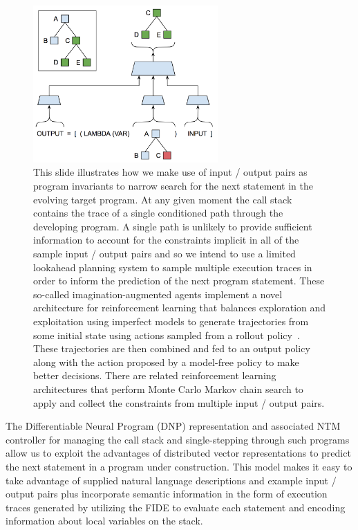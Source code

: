 \begin{figure}
%
  \begin{center} 
    \includegraphics[width=200pt]{./figures/Differentiable_Program_Emulation.png} %
  \end{center}
%
  \caption{This slide illustrates how we make use of input / output pairs as program invariants to narrow search for the next statement in the evolving target program. At any given moment the call stack contains the trace of a single conditioned path through the developing program. A single path is unlikely to provide sufficient information to account for the constraints implicit in all of the sample input / output pairs and so we intend to use a limited lookahead planning system to sample multiple execution traces in order to inform the prediction of the next program statement. 
%
These so-called imagination-augmented agents implement a novel architecture for reinforcement learning that balances exploration and exploitation using imperfect models to generate trajectories from some initial state using actions sampled from a rollout policy~\cite{PascanuetalCoRR-17,WeberetalCoRR-17,HamricketalCoRR-17,GuezetalCoRR-18}. These trajectories are then combined and fed to an output policy along with the action proposed by a model-free policy to make better decisions. There are related reinforcement learning architectures that perform Monte Carlo Markov chain search to apply and collect the constraints from multiple input / output pairs.}
%
  \label{fig_Differentiable_Program_Emulation}
%
\end{figure}


The Differentiable Neural Program (DNP) representation and associated NTM controller for managing the call stack and single-stepping through such programs allow us to exploit the advantages of distributed vector representations to predict the next statement in a program under construction. This model makes it easy to take advantage of supplied natural language descriptions and example input / output pairs plus incorporate semantic information in the form of execution traces generated by utilizing the FIDE to evaluate each statement and encoding information about local variables on the stack. 

